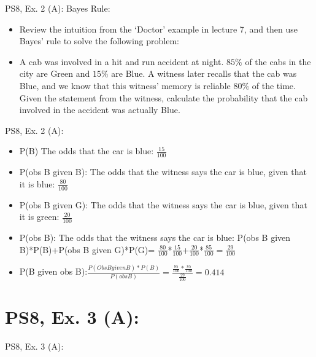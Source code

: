\begin{frame}{PS8, Ex. 2 (A): Bayes Rule:}
    \vspace{-10pt}
    \begin{itemize}
        \item Review the intuition from the ‘Doctor’ example in lecture 7, and then use Bayes’ rule to solve the following problem:
        \item A cab was involved in a hit and run accident at night. $85\%$ of the cabs in the city are Green and $15\%$ are Blue. A witness later recalls that the cab was Blue, and we know that this witness’ memory is reliable $80\%$ of the time. Given the statement from the witness, calculate the probability that the cab involved in the accident was actually Blue.
    \end{itemize}
    \vfill\null
\end{frame}

\begin{frame}{PS8, Ex. 2 (A): }
    \begin{itemize}
        \item P(B) The odds that the car is blue: $\frac{15}{100}$
        \item P(obs B given B): The odds that the witness says the car is blue, given that it is blue: $\frac{80}{100}$
        \item P(obs B given G): The odds that the witness says the car is blue, given that it is green: $\frac{20}{100}$
        \item P(obs B): The odds that the witness says the car is blue: P(obs B given B)*P(B)+P(obs B given G)*P(G)= $\frac{80}{100}$*$\frac{15}{100}$+$\frac{20}{100}$*$\frac{85}{100}=\frac{29}{100}$
        \item P(B given obs B):$\frac{P(Obs B given B)*P(B)}{P(obs B)}=\frac{\frac{85}{100}*\frac{85}{100}}{\frac{29}{100}}=0.414$
    \end{itemize}
\end{frame}


\section{PS8, Ex. 3 (A): }

\begin{frame}{PS8, Ex. 3 (A): }
  \begin{multicols}{2}
    \vfill\null\columnbreak
    \vfill\null
  \end{multicols}
\end{frame}

